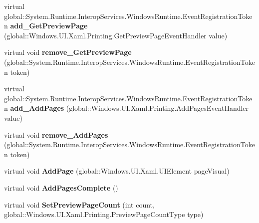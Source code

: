 \begin{DoxyCompactItemize}
virtual global\+::\+System.\+Runtime.\+Interop\+Services.\+Windows\+Runtime.\+Event\+Registration\+Token {\bfseries add\+\_\+\+Get\+Preview\+Page} (global\+::\+Windows.\+U\+I.\+Xaml.\+Printing.\+Get\+Preview\+Page\+Event\+Handler value)
\item 
\mbox{\label{class_windows_1_1_u_i_1_1_xaml_1_1_printing_1_1_print_document_a049493be7cb40ba87e23a1fff9cca61a}} 
virtual void {\bfseries remove\+\_\+\+Get\+Preview\+Page} (global\+::\+System.\+Runtime.\+Interop\+Services.\+Windows\+Runtime.\+Event\+Registration\+Token token)
\item 
\mbox{\label{class_windows_1_1_u_i_1_1_xaml_1_1_printing_1_1_print_document_abcf27815570562c0335caae5ab74ff34}} 
virtual global\+::\+System.\+Runtime.\+Interop\+Services.\+Windows\+Runtime.\+Event\+Registration\+Token {\bfseries add\+\_\+\+Add\+Pages} (global\+::\+Windows.\+U\+I.\+Xaml.\+Printing.\+Add\+Pages\+Event\+Handler value)
\item 
\mbox{\label{class_windows_1_1_u_i_1_1_xaml_1_1_printing_1_1_print_document_ac0b62cd4a9c0d95589b9afcb1f7a0082}} 
virtual void {\bfseries remove\+\_\+\+Add\+Pages} (global\+::\+System.\+Runtime.\+Interop\+Services.\+Windows\+Runtime.\+Event\+Registration\+Token token)
\item 
\mbox{\label{class_windows_1_1_u_i_1_1_xaml_1_1_printing_1_1_print_document_ab73e0795893f75e4c311206a05f5604e}} 
virtual void {\bfseries Add\+Page} (global\+::\+Windows.\+U\+I.\+Xaml.\+U\+I\+Element page\+Visual)
\item 
\mbox{\label{class_windows_1_1_u_i_1_1_xaml_1_1_printing_1_1_print_document_a86b1ab90c519769c55161873f7402602}} 
virtual void {\bfseries Add\+Pages\+Complete} ()
\item 
\mbox{\label{class_windows_1_1_u_i_1_1_xaml_1_1_printing_1_1_print_document_acdb1e1f03c6ad6617b2045feee076bb1}} 
virtual void {\bfseries Set\+Preview\+Page\+Count} (int count, global\+::\+Windows.\+U\+I.\+Xaml.\+Printing.\+Preview\+Page\+Count\+Type type)

\end{DoxyCompactItemize}
